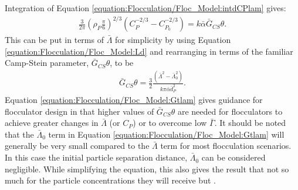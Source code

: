 \documentclass[letterpaper,10pt,english]{sphinxmanual}
\begin{document}
Integration of Equation \eqref{equation:Flocculation/Floc_Model:intdCPlam} gives:
\begin{equation}\label{equation:Flocculation/Floc_Model:CPlamint}
\begin{split}      \frac{3}{2\pi}\left(\rho_{P}\frac{\pi}{6}\right)^{2/3}\left(C_{P}^{-2/3}-C_{P_0}^{-2/3}\right)=k\bar{\alpha}\bar G_{CS}\theta.\end{split}
\end{equation}
This can be put in terms of \(\bar \Lambda\) for simplicity by using Equation \eqref{equation:Flocculation/Floc_Model:Ld} and rearranging in terms of the familiar Camp-Stein parameter, \(\bar G_{CS}\theta\), to be
\begin{equation}\label{equation:Flocculation/Floc_Model:Gtlam}
\begin{split}      \bar G_{CS}\theta = \frac{3}{2}\frac{{\left( {{\bar \Lambda ^2} - \bar \Lambda _0^2} \right)}}{{k\pi\bar{\alpha} \bar{d}_P^2}}.\end{split}
\end{equation}
Equation \eqref{equation:Flocculation/Floc_Model:Gtlam} gives guidance for flocculator design in that higher values of \(\bar G_{CS}\theta\) are needed for flocculators to achieve greater changes in \(\bar \Lambda\) (or \(C_P\)) or to overcome low \(\bar{\Gamma}\). It should be noted that the \(\bar \Lambda_0\) term in Equation \eqref{equation:Flocculation/Floc_Model:Gtlam} will generally be very small compared to the \(\bar \Lambda\) term for most flocculation scenarios. In this case the initial particle separation distance, \(\bar \Lambda_0\) can be considered negligible. While simplifying the equation, this also gives the result that  not so much for the particle concentrations they will receive but .
\end{document}
